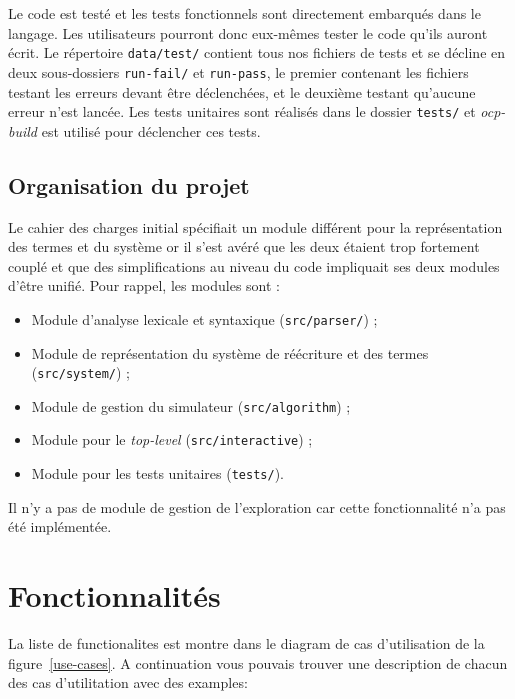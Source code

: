 \documentclass[12pt,a4paper]{article}
\begin{document}
Le code est testé et les tests fonctionnels sont directement embarqués dans le langage. Les utilisateurs pourront donc eux-mêmes tester le code qu'ils auront écrit. Le répertoire \verb=data/test/= contient tous nos fichiers de tests et se décline en deux sous-dossiers \verb=run-fail/= et \verb=run-pass=, le premier contenant les fichiers testant les erreurs devant être déclenchées, et le deuxième testant qu'aucune erreur n'est lancée. Les tests unitaires sont réalisés dans le dossier \verb=tests/= et \textit{ocp-build} est utilisé pour déclencher ces tests.

\subsection{Organisation du projet}

Le cahier des charges initial spécifiait un module différent pour la représentation des termes et du système or il s'est avéré que les deux étaient trop fortement couplé et que des simplifications au niveau du code impliquait ses deux modules d'être unifié. Pour rappel, les modules sont :

\begin{itemize}
\item Module d'analyse lexicale et syntaxique (\verb=src/parser/=) ;
\item Module de représentation du système de réécriture et des termes (\verb=src/system/=) ;
\item Module de gestion du simulateur (\verb=src/algorithm=) ;
\item Module pour le \textit{top-level} (\verb=src/interactive=) ;
\item Module pour les tests unitaires (\verb=tests/=).
\end{itemize}

Il n'y a pas de module de gestion de l'exploration car cette fonctionnalité n'a pas été implémentée.

\section{Fonctionnalités}

La liste de functionalites est montre dans le diagram de cas
d'utilisation de la figure~\ref{use-cases}. A continuation vous
pouvais trouver une description de chacun des cas d'utilitation avec
des examples:
\end{document}
